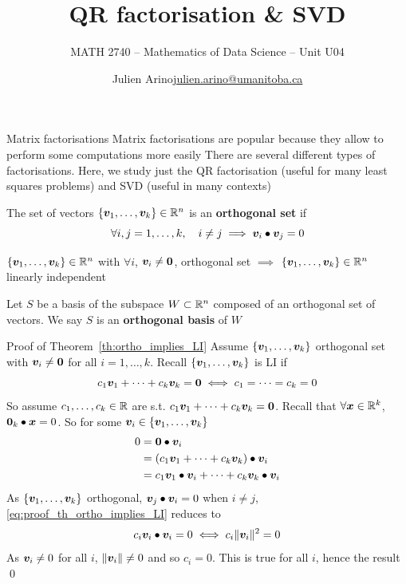 \documentclass[aspectratio=169]{beamer}\usepackage[]{graphicx}\usepackage[]{xcolor}
\subtitle{MATH 2740 -- Mathematics of Data Science -- Unit U04}
\author{\texorpdfstring{Julien Arino\newline\url{julien.arino@umanitoba.ca}}{Julien Arino}}
\institute{Department of Mathematics @ University of Manitoba}
\title{QR factorisation \& SVD}
\begin{document}
\setcounter{theorem}{56}

\SStitlepage
\SSoutlinepage


\begin{frame}{Matrix factorisations}
	Matrix factorisations are popular because they allow to perform some computations more easily
	\vfill
	There are several different types of factorisations. Here, we study just the QR factorisation (useful for many least squares problems) and SVD (useful in many contexts)
\end{frame}	
	



\begin{frame}
\begin{importantdefinition}
The set of vectors $\{\bm{v}_1,\ldots,\bm{v}_k\}\in\mathbb{R}^n$ is an \textbf{orthogonal set} if
\[
\forall i,j=1,\ldots,k,\quad i\neq j \implies \bm{v}_i\bullet\bm{v}_j=0
\]
\end{importantdefinition}
\vfill
\begin{theorem}\label{th:ortho_implies_LI}
$\{\bm{v}_1,\ldots,\bm{v}_k\}\in\mathbb{R}^n$ with $\forall i$, $\bv_i\neq\b0$, orthogonal set $\implies$ $\{\bm{v}_1,\ldots,\bm{v}_k\}\in\mathbb{R}^n$ linearly independent
\end{theorem}
\vfill
\begin{definition}
Let $S$ be a basis of the subspace $W\subset\mathbb{R}^n$ composed of an orthogonal set of vectors. We say $S$ is an \textbf{orthogonal basis} of $W$
\end{definition}
\end{frame}

\begin{frame}{Proof of Theorem~\ref{th:ortho_implies_LI}}
Assume $\{\bm{v}_1,\ldots,\bm{v}_k\}$ orthogonal set with $\bv_i\neq\b0$ for all $i=1,\ldots,k$. Recall $\{\bm{v}_1,\ldots,\bm{v}_k\}$ is LI if 
\[
c_1\bv_1+\cdots+c_k\bv_k=\b0\iff c_1=\cdots=c_k=0
\]
So assume $c_1,\ldots,c_k\in\mathbb{R}$ are s.t. $c_1\bv_1+\cdots+c_k\bv_k=\b0$.
Recall that $\forall\bm{x}\in\mathbb{R}^k$, $\b0_k\bullet\bx=0$. So for some $\bm{v}_i\in\{\bm{v}_1,\ldots,\bm{v}_k\}$
\begin{align}
0 &= \b0\bullet\bv_i \nonumber \\
&= (c_1\bv_1+\cdots+c_k\bv_k)\bullet\bv_i \nonumber \\
&= c_1\bv_1\bullet\bv_i+\cdots+c_k\bv_k\bullet\bv_i \label{eq:proof_th_ortho_implies_LI}
\end{align}
As $\{\bm{v}_1,\ldots,\bm{v}_k\}$ orthogonal, $\bm{v}_j\bullet\bm{v}_i=0$ when $i\neq j$, \eqref{eq:proof_th_ortho_implies_LI} reduces to
\[
c_i\bm{v}_i\bullet\bm{v}_i = 0 \iff c_i\|\bm{v}_i\|^2 = 0
\]
As $\bm{v}_i\neq 0$ for all $i$, $\|\bm{v}_i\|\neq 0$ and so $c_i=0$. This is true for all $i$, hence the result \hfill\qed
\end{frame}
\end{document}
